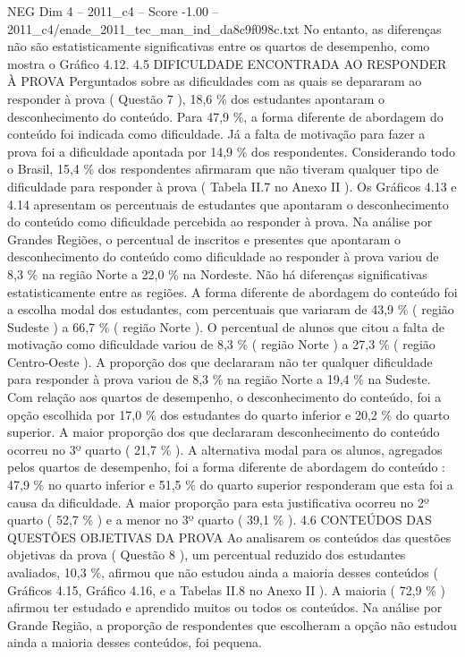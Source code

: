 \begin{textsample}{NEG Dim 4 – 2011\_c4 – Score -1.00 – 2011\_c4/enade\_2011\_tec\_man\_ind\_da8c9f098c.txt}
No entanto, as diferenças não são estatisticamente significativas entre os quartos de desempenho, como mostra o Gráfico 4.12. 4.5 DIFICULDADE ENCONTRADA AO RESPONDER À PROVA Perguntados sobre as dificuldades com as quais se depararam ao responder à prova ( Questão 7 ), 18,6 \% dos estudantes apontaram o desconhecimento do conteúdo.
Para 47,9 \%, a forma diferente de abordagem do conteúdo foi indicada como dificuldade.
Já a falta de motivação para fazer a prova foi a dificuldade apontada por 14,9 \% dos respondentes.
Considerando todo o Brasil, 15,4 \% dos respondentes afirmaram que não tiveram qualquer tipo de dificuldade para responder à prova ( Tabela II.7 no Anexo II ).
Os Gráficos 4.13 e 4.14 apresentam os percentuais de estudantes que apontaram o desconhecimento do conteúdo como dificuldade percebida ao responder à prova.
Na análise por Grandes Regiões, o percentual de inscritos e presentes que apontaram o desconhecimento do conteúdo como dificuldade ao responder à prova variou de 8,3 \% na região Norte a 22,0 \% na Nordeste.
Não há diferenças significativas estatisticamente entre as regiões.
A forma diferente de abordagem do conteúdo foi a escolha modal dos estudantes, com percentuais que variaram de 43,9 \% ( região Sudeste ) a 66,7 \% ( região Norte ).
O percentual de alunos que citou a falta de motivação como dificuldade variou de 8,3 \% ( região Norte ) a 27,3 \% ( região Centro-Oeste ).
A proporção dos que declararam não ter qualquer dificuldade para responder à prova variou de 8,3 \% na região Norte a 19,4 \% na Sudeste.
Com relação aos quartos de desempenho, o desconhecimento do conteúdo, foi a opção escolhida por 17,0 \% dos estudantes do quarto inferior e 20,2 \% do quarto superior.
A maior proporção dos que declararam desconhecimento do conteúdo ocorreu no 3º quarto ( 21,7 \% ).
A alternativa modal para os alunos, agregados pelos quartos de desempenho, foi a forma diferente de abordagem do conteúdo : 47,9 \% no quarto inferior e 51,5 \% do quarto superior responderam que esta foi a causa da dificuldade.
A maior proporção para esta justificativa ocorreu no 2º quarto ( 52,7 \% ) e a menor no 3º quarto ( 39,1 \% ). 4.6 CONTEÚDOS DAS QUESTÕES OBJETIVAS DA PROVA Ao analisarem os conteúdos das questões objetivas da prova ( Questão 8 ), um percentual reduzido dos estudantes avaliados, 10,3 \%, afirmou que não estudou ainda a maioria desses conteúdos ( Gráficos 4.15, Gráfico 4.16, e a Tabelas II.8 no Anexo II ).
A maioria ( 72,9 \% ) afirmou ter estudado e aprendido muitos ou todos os conteúdos.
Na análise por Grande Região, a proporção de respondentes que escolheram a opção não estudou ainda a maioria desses conteúdos, foi pequena.

\end{textsample}

